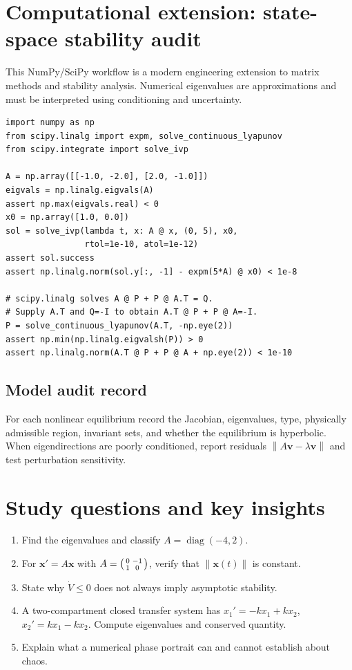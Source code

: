 \documentclass[11pt,letterpaper,oneside]{report}
\theoremstyle{definition}\newtheorem{definition}[theorem]{Definition}
\theoremstyle{remark}\newtheorem{remark}[theorem]{Remark}
\newcommand{\norm}[1]{\left\lVert#1\right\rVert}
\begin{document}
\chapter{Computational extension: state-space stability audit}
\begin{modern}This NumPy/SciPy workflow is a modern engineering extension to matrix methods and stability analysis. Numerical eigenvalues are approximations and must be interpreted using conditioning and uncertainty.\end{modern}
\begin{lstlisting}
import numpy as np
from scipy.linalg import expm, solve_continuous_lyapunov
from scipy.integrate import solve_ivp

A = np.array([[-1.0, -2.0], [2.0, -1.0]])
eigvals = np.linalg.eigvals(A)
assert np.max(eigvals.real) < 0
x0 = np.array([1.0, 0.0])
sol = solve_ivp(lambda t, x: A @ x, (0, 5), x0,
                rtol=1e-10, atol=1e-12)
assert sol.success
assert np.linalg.norm(sol.y[:, -1] - expm(5*A) @ x0) < 1e-8

# scipy.linalg solves A @ P + P @ A.T = Q.
# Supply A.T and Q=-I to obtain A.T @ P + P @ A=-I.
P = solve_continuous_lyapunov(A.T, -np.eye(2))
assert np.min(np.linalg.eigvalsh(P)) > 0
assert np.linalg.norm(A.T @ P + P @ A + np.eye(2)) < 1e-10
\end{lstlisting}
\section{Model audit record}
For each nonlinear equilibrium record the Jacobian, eigenvalues, type, physically admissible region, invariant sets, and whether the equilibrium is hyperbolic. When eigendirections are poorly conditioned, report residuals $\norm{A\mathbf v-\lambda\mathbf v}$ and test perturbation sensitivity.
\chapter{Study questions and key insights}
\begin{enumerate}
\item Find the eigenvalues and classify $A=\operatorname{diag}(-4,2)$.
\item For $\mathbf x'=A\mathbf x$ with $A=\begin{psmallmatrix}0&-1\\1&0\end{psmallmatrix}$, verify that $\norm{\mathbf x(t)}$ is constant.
\item State why $\dot V\le0$ does not always imply asymptotic stability.
\item A two-compartment closed transfer system has $x_1'=-kx_1+kx_2$, $x_2'=kx_1-kx_2$. Compute eigenvalues and conserved quantity.
\item Explain what a numerical phase portrait can and cannot establish about chaos.
\end{enumerate}
\end{document}
